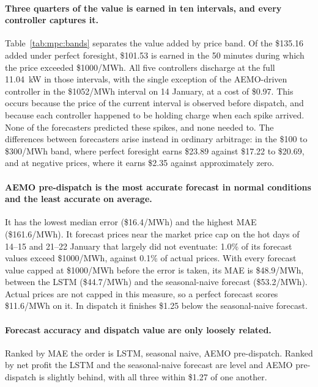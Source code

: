 \paragraph{Three quarters of the value is earned in ten intervals, and every controller captures it.}
Table~\ref{tab:mpc:bands} separates the value added by price band. Of the \$135.16 added
under perfect foresight, \$101.53 is earned in the 50 minutes during which the price
exceeded \$1000/MWh. All five controllers discharge at the full 11.04~kW in those
intervals, with the single exception of the AEMO-driven controller in the
\$1052/MWh interval on 14 January, at a cost of \$0.97. This occurs because the price of
the current interval is observed before dispatch, and because each controller happened
to be holding charge when each spike arrived. None of the forecasters predicted these
spikes, and none needed to. The differences between forecasters arise instead in
ordinary arbitrage: in the \$100 to \$300/MWh band, where perfect foresight earns
\$23.89 against \$17.22 to \$20.69, and at negative prices, where it earns \$2.35
against approximately zero.

\paragraph{AEMO pre-dispatch is the most accurate forecast in normal conditions and the least accurate on average.}
It has the lowest median error (\$16.4/MWh) and the highest MAE (\$161.6/MWh). It
forecast prices near the market price cap on the hot days of 14--15 and 21--22 January
that largely did not eventuate: 1.0\% of its forecast values exceed \$1000/MWh, against
0.1\% of actual prices. With every forecast value capped at \$1000/MWh before the error
is taken, its MAE is \$48.9/MWh, between the LSTM (\$44.7/MWh) and the seasonal-naive
forecast (\$53.2/MWh). Actual prices are not capped in this measure, so a perfect
forecast scores \$11.6/MWh on it. In dispatch it finishes \$1.25 below the seasonal-naive forecast.

\paragraph{Forecast accuracy and dispatch value are only loosely related.}
Ranked by MAE the order is LSTM, seasonal naive, AEMO pre-dispatch. Ranked by net
profit the LSTM and the seasonal-naive forecast are level and AEMO pre-dispatch is
slightly behind, with all three within \$1.27 of one another.

